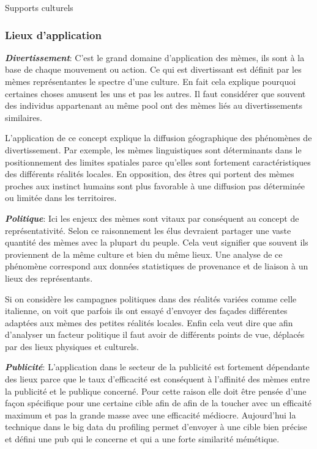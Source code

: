 \documentclass[12pt]{article}
\begin{document}
Supports culturels

\subsubsection{Lieux d'application}

\emph{\textbf{Divertissement}}: C'est le grand domaine d'application des
mèmes, ils sont à la base de chaque mouvement ou action. Ce qui est
divertissant est définit par les mèmes représentantes le spectre d'une
culture. En fait cela explique pourquoi certaines choses amusent les uns
et pas les autres. Il faut considérer que souvent des individus
appartenant au même pool ont des mèmes liés au divertissements
similaires.

L'application de ce concept explique la diffusion géographique des
phénomènes de divertissement. Par exemple, les mèmes linguistiques sont
déterminants dans le positionnement des limites spatiales parce qu'elles
sont fortement caractéristiques des différents réalités locales. En
opposition, des êtres qui portent des mèmes proches aux instinct humains
sont plus favorable à une diffusion pas déterminée ou limitée dans les
territoires.

\emph{\textbf{Politique}}: Ici les enjeux des mèmes sont vitaux par
conséquent au concept de représentativité. Selon ce raisonnement les
élus devraient partager une vaste quantité des mèmes avec la plupart du
peuple. Cela veut signifier que souvent ils proviennent de la même
culture et bien du même lieux. Une analyse de ce phénomène correspond
aux données statistiques de provenance et de liaison à un lieux des
représentants.

Si on considère les campagnes politiques dans des réalités variées comme
celle italienne, on voit que parfois ils ont essayé d'envoyer des
façades différentes adaptées aux mèmes des petites réalités locales.
Enfin cela veut dire que afin d'analyser un facteur politique il faut
avoir de différents points de vue, déplacés par des lieux physiques et
culturels.

\emph{\textbf{Publicité}}: L'application dans le secteur de la publicité
est fortement dépendante des lieux parce que le taux d'efficacité est
conséquent à l'affinité des mèmes entre la publicité et le publique
concerné. Pour cette raison elle doit être pensée d'une façon spécifique
pour une certaine cible afin de afin de la toucher avec un efficaité
maximum et pas la grande masse avec une efficacité médiocre. Aujourd'hui
la technique dans le big data du profiling permet d'envoyer à une cible
bien précise et défini une pub qui le concerne et qui a une forte
similarité mémétique.
\end{document}
